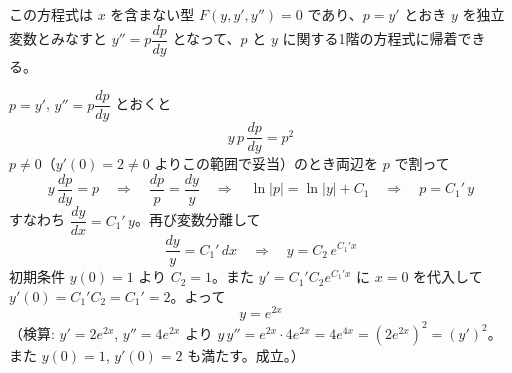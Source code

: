 
この方程式は $x$ を含まない型 $F(y, y', y'') = 0$ であり、$p = y'$ とおき $y$ を独立変数とみなすと $y'' = p\dfrac{dp}{dy}$ となって、$p$ と $y$ に関する1階の方程式に帰着できる。

$p = y'$, $y'' = p\dfrac{dp}{dy}$ とおくと
\[
y\,p\,\frac{dp}{dy} = p^{2}
\]
$p \neq 0$（$y'(0) = 2 \neq 0$ よりこの範囲で妥当）のとき両辺を $p$ で割って
\[
y\,\frac{dp}{dy} = p
\quad\Longrightarrow\quad
\frac{dp}{p} = \frac{dy}{y}
\quad\Longrightarrow\quad
\ln|p| = \ln|y| + C_{1}
\quad\Longrightarrow\quad
p = C_{1}'\,y
\]
すなわち $\dfrac{dy}{dx} = C_{1}'\,y$。再び変数分離して
\[
\frac{dy}{y} = C_{1}'\,dx
\quad\Longrightarrow\quad
y = C_{2}\,e^{C_{1}' x}
\]
初期条件 $y(0) = 1$ より $C_{2} = 1$。また $y' = C_{1}' C_{2} e^{C_{1}' x}$ に $x=0$ を代入して $y'(0) = C_{1}' C_{2} = C_{1}' = 2$。よって
\[
\boxed{\; y = e^{2x} \;}
\]
（検算: $y' = 2e^{2x}$, $y'' = 4e^{2x}$ より $y\,y'' = e^{2x}\cdot 4e^{2x} = 4e^{4x} = (2e^{2x})^{2} = (y')^{2}$。また $y(0)=1$, $y'(0)=2$ も満たす。成立。）
